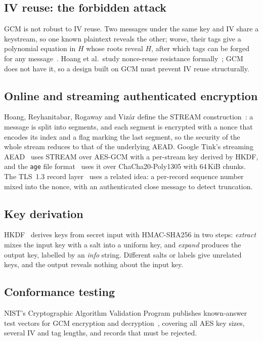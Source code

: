 \documentclass[11pt,a4paper]{article}
\begin{document}
\subsection{IV reuse: the forbidden attack}
GCM is not robust to IV reuse. Two messages under the same key and IV share a keystream, so one known plaintext reveals the other; worse, their tags give a polynomial equation in $H$ whose roots reveal $H$, after which tags can be forged for any message~\cite{joux}. Hoang et al.\ study nonce-reuse resistance formally~\cite{hrrv}; GCM does not have it, so a design built on GCM must prevent IV reuse structurally.

\subsection{Online and streaming authenticated encryption}
Hoang, Reyhanitabar, Rogaway and Viz\'ar define the STREAM construction~\cite{hrrv}: a message is split into segments, and each segment is encrypted with a nonce that encodes its index and a flag marking the last segment, so the security of the whole stream reduces to that of the underlying AEAD. Google Tink's streaming AEAD~\cite{tink} uses STREAM over AES-GCM with a per-stream key derived by HKDF, and the \texttt{age} file format~\cite{age} uses it over ChaCha20-Poly1305 with 64\,KiB chunks. The TLS~1.3 record layer~\cite{rfc8446} uses a related idea: a per-record sequence number mixed into the nonce, with an authenticated close message to detect truncation.

\subsection{Key derivation}
HKDF~\cite{rfc5869} derives keys from secret input with HMAC-SHA256 in two steps: \emph{extract} mixes the input key with a salt into a uniform key, and \emph{expand} produces the output key, labelled by an \emph{info} string. Different salts or labels give unrelated keys, and the output reveals nothing about the input key.

\subsection{Conformance testing}
NIST's Cryptographic Algorithm Validation Program publishes known-answer test vectors for GCM encryption and decryption~\cite{cavp}, covering all AES key sizes, several IV and tag lengths, and records that must be rejected.
\end{document}
